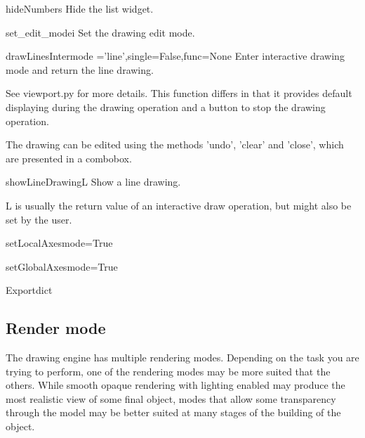\begin{funcdesc}{hideNumbers}{}
Hide the list widget.
\end{funcdesc}

\begin{funcdesc}{set_edit_mode}{i}
Set the drawing edit mode.
\end{funcdesc}

\begin{funcdesc}{drawLinesInter}{mode ='line',single=False,func=None}
Enter interactive drawing mode and return the line drawing.

See viewport.py for more details.
This function differs in that it provides default displaying
during the drawing operation and a button to stop the drawing operation.

The drawing can be edited using the methods 'undo', 'clear' and 'close', which
are presented in a combobox.

\end{funcdesc}

\begin{funcdesc}{showLineDrawing}{L}
Show a line drawing.

L is usually the return value of an interactive draw operation, but
might also be set by the user.

\end{funcdesc}

\begin{funcdesc}{setLocalAxes}{mode=True}
\end{funcdesc}

\begin{funcdesc}{setGlobalAxes}{mode=True}
\end{funcdesc}

\begin{funcdesc}{Export}{dict}
\end{funcdesc}


\subsection{Render mode}

The \pyformex drawing engine has multiple rendering modes. Depending on the task you are trying to perform, one of the rendering modes may be more suited that the others. While smooth opaque rendering with lighting enabled may produce the most realistic view of some final object, modes that allow some transparency through the model may be better suited at many stages of the building of the object.

